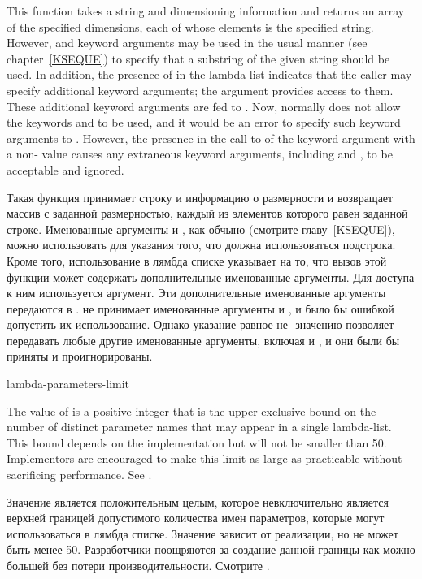 This function takes a string and dimensioning information and returns
an array of the specified dimensions, each of whose elements is the
specified string.  However,  and  keyword arguments
may be used in the usual manner (see chapter~\ref{KSEQUE}) to specify
that a substring of the given string should be used.  In addition,
the presence of  in the lambda-list indicates that the caller
may specify additional keyword arguments; the  argument provides
access to them.  These additional keyword arguments are fed to .
Now,  normally does not allow the keywords 
and  to be used, and it would be an error to specify such
keyword arguments to .  However, the presence in the
call to  of the keyword argument 
with a non-{\false} value causes any extraneous keyword arguments,
including  and , to be acceptable and ignored.

Такая функция принимает строку и информацию о размерности и возвращает массив с
заданной размерностью, каждый из элементов которого равен заданной
строке. Именованные аргументы  и , как обчыно (смотрите
главу~\ref{KSEQUE}), можно использовать для указания того, что должна
использоваться подстрока. Кроме того, использование  в
лямбда списке указывает на то, что вызов этой функции может содержать
дополнительные именованные аргументы. Для доступа к ним используется 
аргумент. Эти дополнительные именованные аргументы передаются в
.  не принимает именованные аргументы
 и , и было бы ошибкой допустить их использование. Однако
указание  равное не-{\false} значению позволяет передавать
любые другие именованные аргументы, включая  и , и они были
бы приняты и проигнорированы.

\begin{defun}[Constant]
lambda-parameters-limit

The value of  is a positive integer that is
the upper exclusive bound on the number of distinct parameter names
that may appear in a single lambda-list.
This bound depends on the implementation
but will not be smaller than 50.
Implementors are encouraged to make this limit as large as practicable
without sacrificing performance.
See .

Значение  является положительным целым, которое
невключительно является верхней границей допустимого количества имен параметров,
которые могут использоваться в лямбда списке.
Значение зависит от реализации, но не может быть менее 50.
Разработчики поощряются за создание данной границы как можно большей без потери
производительности. 
Смотрите .
\end{defun}


